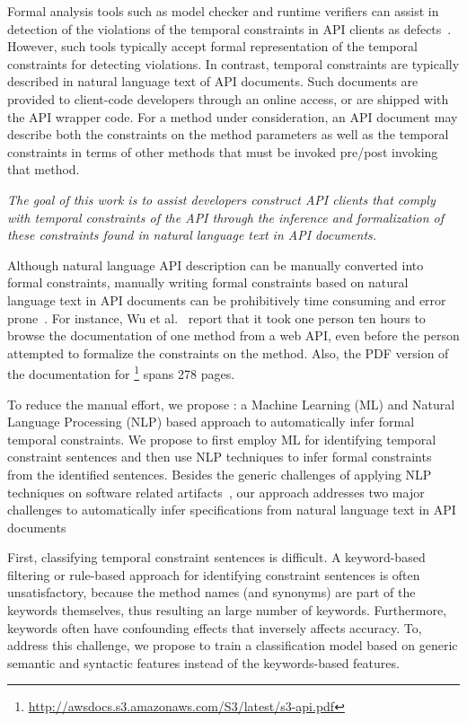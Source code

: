 Formal analysis tools such as model checker and runtime verifiers can assist in detection of the violations of the temporal constraints in API clients as defects~\cite{lee2012towards}.
However, such tools typically accept formal representation of the temporal constraints for detecting violations.
In contrast, temporal constraints are typically described in natural language text of API documents.
Such documents are provided to client-code developers through an online access, or are shipped with the API wrapper code.
For a method under consideration, an API document may describe both the constraints on the method parameters
as well as the temporal constraints in terms of other methods that must be invoked pre/post invoking that method.

\textit{The goal of this work is to assist developers construct API clients that comply with
	temporal constraints of the API through the inference and formalization of these constraints found in natural language text in API documents.}

Although natural language API description can be manually converted into formal constraints,
manually writing formal constraints based on natural language text in API documents can be prohibitively time consuming and error prone~\cite{wu2013inferring,RubingerWEB10}. 
For instance, Wu et al.~\cite{wu2013inferring} report that it took one person ten hours to browse the documentation of one method from a web API, even before the person attempted to formalize the constraints on the method. Also, the PDF version of the documentation for \amazonAPI\footnote{{\small \url{http://awsdocs.s3.amazonaws.com/S3/latest/s3-api.pdf}}} spans 278 pages.


To reduce the manual effort, we propose \tool: a Machine Learning (ML) and Natural Language Processing (NLP) based approach
to automatically infer formal temporal constraints. 
We propose to first employ ML for identifying temporal constraint sentences and then use NLP techniques to infer formal constraints from the identified sentences. 
Besides the generic challenges of applying NLP techniques on software related artifacts~\cite{pandita12:inferring},
our approach addresses two major challenges to automatically infer specifications from natural language text in API documents 

First, classifying temporal constraint sentences is difficult. A keyword-based filtering or rule-based approach for identifying constraint sentences is often unsatisfactory, because the method names (and synonyms) are part of the keywords themselves, thus resulting an large number of keywords.
Furthermore, keywords often have confounding effects that inversely affects accuracy.
To, address this challenge, we propose to train a classification model based on generic semantic and syntactic features instead of the keywords-based features.    

